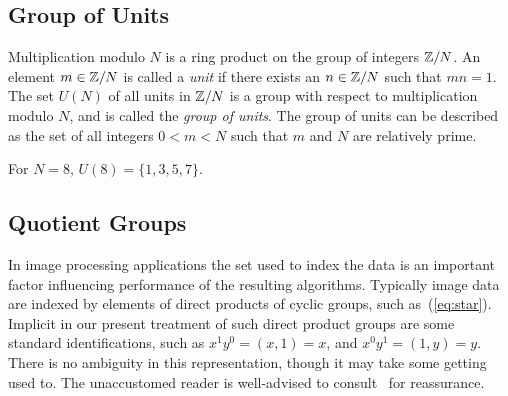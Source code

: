 \subsection{Group of Units}
Multiplication modulo $N$ is a ring product on the group of
integers $\mathbb{Z}/N$. An element $m\in \mathbb{Z}/N$ is called a {\it unit} if
there exists an $n\in \mathbb{Z}/N$ such that $mn = 1$.  The set
$U(N)$ of all units in $\mathbb{Z}/N$ is a group with respect to
multiplication modulo $N$, and is called the 
\emph{group of units}.%
The group of units can be described %
as the set of all integers $0<m<N$ such that $m$ and $N$ are
relatively prime.  
\begin{example}
For $N=8$, 
$U(8) = \{1, 3, 5, 7\}$.
\end{example}

\subsection{Quotient Groups}
In image processing applications the set used to index the data 
is an important factor influencing performance of the
resulting algorithms.
Typically image data are indexed by elements
of direct products of cyclic groups, such as~(\ref{eq:star}).
Implicit in our present treatment of such direct product groups 
are some standard identifications, such as $x^1y^0 = (x,1) = x$, and $x^0y^1 =
(1,y) = y$.  There is no ambiguity in this representation, though
it may take some getting used to. The unaccustomed reader is well-advised to 
consult~\cite{An:2003} for reassurance.

